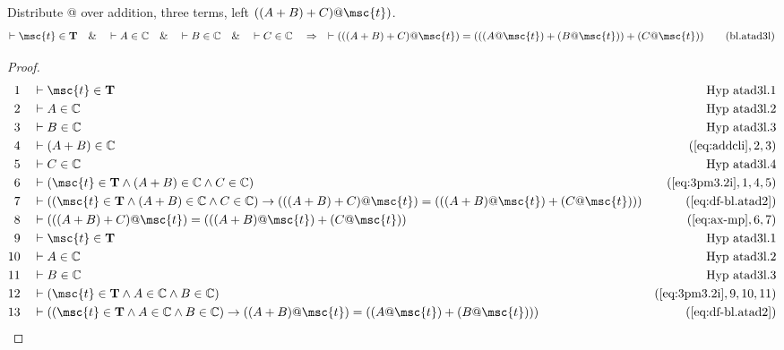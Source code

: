 \begin{lemma} Distribute @ over addition, three terms,
left $( ( A + B ) + C ) @ \msc{t} )$.
\begin{align}
\vdash \msc{t} \in \mathbf{T}\quad\&\quad \vdash A \in \mathbb{C}\quad\&\quad
    \vdash B \in \mathbb{C}\quad\&\quad \vdash C \in
    \mathbb{C}\quad\Rightarrow\quad \vdash ( ( ( A + B ) + C ) @ \msc{t} ) = (
    ( ( A @ \msc{t} ) + ( B @ \msc{t} ) ) + ( C @ \msc{t} )
    )\label{eq:bl.atad3l}\tag{bl.atad3l}
\end{align}
\end{lemma}

\begin{proof}
\begin{align}
  1 &&  & \vdash \msc{t} \in \mathbf{T}&\text{Hyp~atad3l.1}\notag%
  \\ 2 &&  & \vdash A \in \mathbb{C}&\text{Hyp~atad3l.2}\notag%
  \\ 3 &&  & \vdash B \in \mathbb{C}&\text{Hyp~atad3l.3}\notag%
  \\ 4 &&  & \vdash ( A + B ) \in \mathbb{C}&(\mbox{\ref{eq:addcli}},2,3)\notag
  \\ 5 &&  & \vdash C \in \mathbb{C}&\text{Hyp~atad3l.4}\notag%
  \\ 6 &&  & \vdash ( \msc{t} \in \mathbf{T} \wedge ( A + B ) \in \mathbb{C} \wedge C \in \mathbb{C} )&(\mbox{\ref{eq:3pm3.2i}},1,4,5)\notag
  \\ 7 &&  & \vdash ( ( \msc{t} \in \mathbf{T} \wedge ( A + B ) \in \mathbb{C} \wedge C \in \mathbb{C} ) \rightarrow ( ( ( A + B ) + C ) @ \msc{t} ) = ( ( ( A + B ) @ \msc{t} ) + ( C @ \msc{t} ) ) )&(\mbox{\ref{eq:df-bl.atad2}})\notag
  \\ 8 &&  & \vdash ( ( ( A + B ) + C ) @ \msc{t} ) = ( ( ( A + B ) @ \msc{t} ) + ( C @ \msc{t} ) )&(\mbox{\ref{eq:ax-mp}},6,7)\notag
  \\ 9 &&  & \vdash \msc{t} \in \mathbf{T}&\text{Hyp~atad3l.1}\notag%
  \\ 10 &&  & \vdash A \in \mathbb{C}&\text{Hyp~atad3l.2}\notag%
  \\ 11 &&  & \vdash B \in \mathbb{C}&\text{Hyp~atad3l.3}\notag%
  \\ 12 &&  & \vdash ( \msc{t} \in \mathbf{T} \wedge A \in \mathbb{C} \wedge B \in \mathbb{C} )&(\mbox{\ref{eq:3pm3.2i}},9,10,11)\notag
  \\ 13 &&  & \vdash ( ( \msc{t} \in \mathbf{T} \wedge A \in \mathbb{C} \wedge B \in \mathbb{C} ) \rightarrow ( ( A + B ) @ \msc{t} ) = ( ( A @ \msc{t} ) + ( B @ \msc{t} ) ) )&(\mbox{\ref{eq:df-bl.atad2}})\notag

\end{align}
\end{proof}
